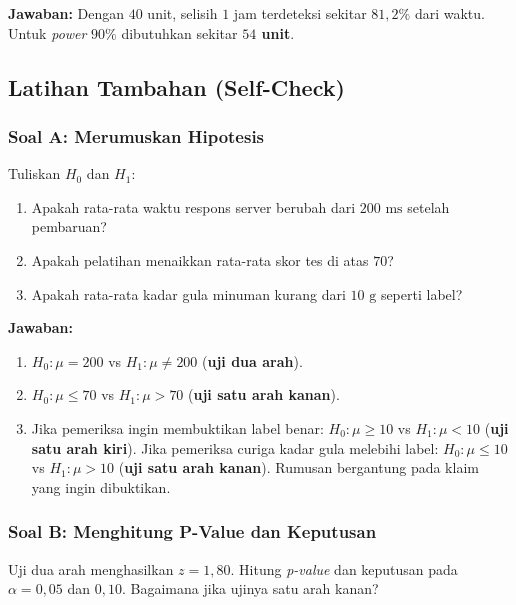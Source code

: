 \documentclass[
  indonesian,
  letterpaper,
]{book}
\providecommand{\tightlist}{%
  \setlength{\itemsep}{0pt}\setlength{\parskip}{0pt}}
\begin{document}
\textbf{Jawaban:} Dengan \(40\) unit, selisih \(1\) jam terdeteksi
sekitar \textbf{\(81{,}2\%\)} dari waktu. Untuk \emph{power} \(90\%\)
dibutuhkan sekitar \textbf{\(54\) unit}.

\subsection{Latihan Tambahan
(Self-Check)}\label{latihan-tambahan-self-check-6}

\subsubsection{Soal A: Merumuskan
Hipotesis}\label{soal-a-merumuskan-hipotesis}

Tuliskan \(H_0\) dan \(H_1\):

\begin{enumerate}
\def\labelenumi{\arabic{enumi}.}
\tightlist
\item
  Apakah rata-rata waktu respons server berubah dari \(200\text{ ms}\)
  setelah pembaruan?
\item
  Apakah pelatihan menaikkan rata-rata skor tes di atas \(70\)?
\item
  Apakah rata-rata kadar gula minuman kurang dari \(10\text{ g}\)
  seperti label?
\end{enumerate}

\textbf{Jawaban:}

\begin{enumerate}
\def\labelenumi{\arabic{enumi}.}
\tightlist
\item
  \(H_0: \mu = 200\) vs \(H_1: \mu \ne 200\) (\textbf{uji dua arah}).
\item
  \(H_0: \mu \le 70\) vs \(H_1: \mu > 70\) (\textbf{uji satu arah
  kanan}).
\item
  Jika pemeriksa ingin membuktikan label benar: \(H_0: \mu \ge 10\) vs
  \(H_1: \mu < 10\) (\textbf{uji satu arah kiri}). Jika pemeriksa curiga
  kadar gula melebihi label: \(H_0: \mu \le 10\) vs \(H_1: \mu > 10\)
  (\textbf{uji satu arah kanan}). Rumusan bergantung pada klaim yang
  ingin dibuktikan.
\end{enumerate}

\subsubsection{Soal B: Menghitung P-Value dan
Keputusan}\label{soal-b-menghitung-p-value-dan-keputusan}

Uji dua arah menghasilkan \(z = 1{,}80\). Hitung \emph{p-value} dan
keputusan pada \(\alpha = 0{,}05\) dan \(0{,}10\). Bagaimana jika ujinya
satu arah kanan?
\end{document}

